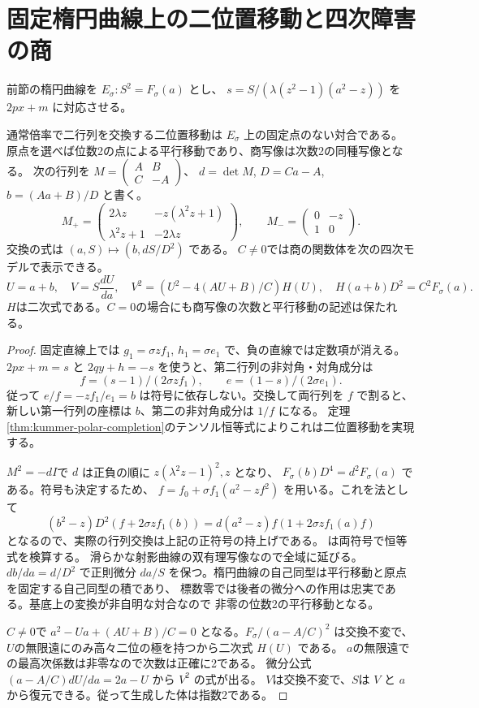 \section{固定楕円曲線上の二位置移動と四次障害の商}
\label{sec:fixed-exchange-isogeny}
前節の楕円曲線を $E_\sigma:S^2=F_\sigma(a)$ とし、
$s=S/(\lambda(z^2-1)(a^2-z))$ を $2px+m$ に対応させる。
\begin{theorem}\label{thm:fixed-exchange-isogeny}
通常倍率で二行列を交換する二位置移動は $E_\sigma$ 上の固定点のない対合である。
原点を選べば位数2の点による平行移動であり、商写像は次数2の同種写像となる。
次の行列を $M=\left(\begin{smallmatrix}A&B\\C&-A\end{smallmatrix}\right)$、
$d=\det M$, $D=Ca-A$, $b=(Aa+B)/D$ と書く。
\[
 M_+=\begin{pmatrix}2\lambda z&-z(\lambda^2z+1)\\
 \lambda^2z+1&-2\lambda z\end{pmatrix},
 \qquad M_-=\begin{pmatrix}0&-z\\1&0\end{pmatrix}.
\]
交換の式は $(a,S)\mapsto (b,dS/D^2)$ である。
$C\ne0$では商の関数体を次の四次モデルで表示できる。
\[
 U=a+b,\quad V=S\frac{dU}{da},\quad
 V^2=\left(U^2-4(AU+B)/C\right)H(U),\quad
 H(a+b)D^2=C^2F_\sigma(a).
\]
$H$は二次式である。$C=0$の場合にも商写像の次数と平行移動の記述は保たれる。
\end{theorem}
\begin{proof}
固定直線上では $g_1=\sigma z f_1$, $h_1=\sigma e_1$ で、負の直線では定数項が消える。
$2px+m=s$ と $2qy+h=-s$ を使うと、第二行列の非対角・対角成分は
\[
 f=(s-1)/(2\sigma z f_1),\qquad e=(1-s)/(2\sigma e_1).
\]
従って $e/f=-zf_1/e_1=b$ は符号に依存しない。交換して両行列を $f$ で割ると、
新しい第一行列の座標は $b$、第二の非対角成分は $1/f$ になる。
定理\ref{thm:kummer-polar-completion}のテンソル恒等式によりこれは二位置移動を実現する。

$M^2=-dI$で $d$ は正負の順に $z(\lambda^2z-1)^2,z$ となり、
$F_\sigma(b)D^4=d^2F_\sigma(a)$ である。符号も決定するため、
$f=f_0+\sigma f_1(a^2-zf^2)$ を用いる。これを法として
\[
 (b^2-z)D^2(f+2\sigma z f_1(b))
 =d(a^2-z) f(1+2\sigma z f_1(a)f)
\]
となるので、実際の行列交換は上記の正符号の持上げである。
 は両符号で恒等式を検算する。
滑らかな射影曲線の双有理写像なので全域に延びる。$db/da=d/D^2$ で正則微分
$da/S$ を保つ。楕円曲線の自己同型は平行移動と原点を固定する自己同型の積であり、
標数零では後者の微分への作用は忠実である。基底上の変換が非自明な対合なので
非零の位数2の平行移動となる。

$C\ne0$で $a^2-Ua+(AU+B)/C=0$ となる。$F_\sigma/(a-A/C)^2$ は交換不変で、
$U$の無限遠にのみ高々二位の極を持つから二次式 $H(U)$ である。
$a$の無限遠での最高次係数は非零なので次数は正確に2である。
微分公式 $(a-A/C)dU/da=2a-U$ から $V^2$ の式が出る。
$V$は交換不変で、$S$は $V$ と $a$ から復元できる。従って生成した体は指数2である。
\end{proof}

